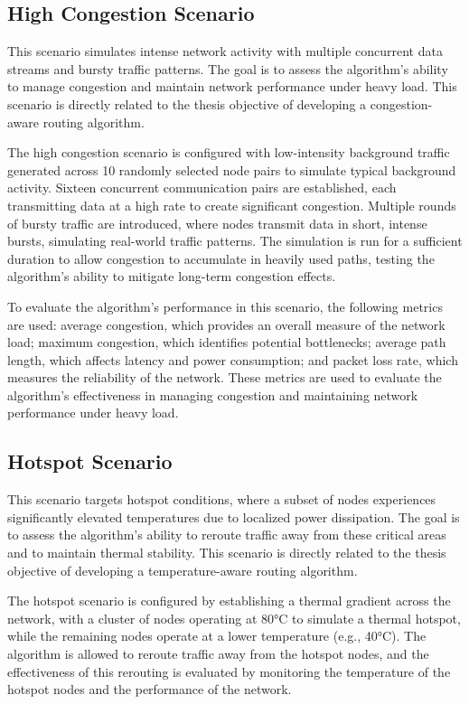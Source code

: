 \documentclass[12pt]{article}
\begin{document}
\subsection{High Congestion Scenario}
This scenario simulates intense network activity with multiple concurrent data streams and bursty traffic patterns. The goal is to assess the algorithm's ability to manage congestion and maintain network performance under heavy load. This scenario is directly related to the thesis objective of developing a congestion-aware routing algorithm.

The high congestion scenario is configured with low-intensity background traffic generated across 10 randomly selected node pairs to simulate typical background activity. Sixteen concurrent communication pairs are established, each transmitting data at a high rate to create significant congestion. Multiple rounds of bursty traffic are introduced, where nodes transmit data in short, intense bursts, simulating real-world traffic patterns. The simulation is run for a sufficient duration to allow congestion to accumulate in heavily used paths, testing the algorithm's ability to mitigate long-term congestion effects.

To evaluate the algorithm's performance in this scenario, the following metrics are used: average congestion, which provides an overall measure of the network load; maximum congestion, which identifies potential bottlenecks; average path length, which affects latency and power consumption; and packet loss rate, which measures the reliability of the network. These metrics are used to evaluate the algorithm's effectiveness in managing congestion and maintaining network performance under heavy load.

\subsection{Hotspot Scenario}
This scenario targets hotspot conditions, where a subset of nodes experiences significantly elevated temperatures due to localized power dissipation. The goal is to assess the algorithm's ability to reroute traffic away from these critical areas and to maintain thermal stability. This scenario is directly related to the thesis objective of developing a temperature-aware routing algorithm.

The hotspot scenario is configured by establishing a thermal gradient across the network, with a cluster of nodes operating at 80°C to simulate a thermal hotspot, while the remaining nodes operate at a lower temperature (e.g., 40°C). The algorithm is allowed to reroute traffic away from the hotspot nodes, and the effectiveness of this rerouting is evaluated by monitoring the temperature of the hotspot nodes and the performance of the network.
\end{document}
